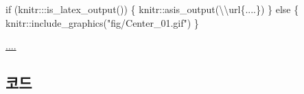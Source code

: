 \documentclass[
  b5paperpaper,
  DIV=11,
  numbers=noendperiod]{scrreprt}
\newenvironment{Shaded}{\begin{snugshade}}{\end{snugshade}}
\newcommand{\ControlFlowTok}[1]{\textcolor[rgb]{0.00,0.23,0.31}{#1}}
\newcommand{\FunctionTok}[1]{\textcolor[rgb]{0.28,0.35,0.67}{#1}}
\newcommand{\NormalTok}[1]{\textcolor[rgb]{0.00,0.23,0.31}{#1}}
\newcommand{\SpecialCharTok}[1]{\textcolor[rgb]{0.37,0.37,0.37}{#1}}
\newcommand{\StringTok}[1]{\textcolor[rgb]{0.13,0.47,0.30}{#1}}
\begin{document}
\begin{Shaded}
\begin{Highlighting}[]
\ControlFlowTok{if}\NormalTok{ (knitr}\SpecialCharTok{:::}\FunctionTok{is\_latex\_output}\NormalTok{()) \{}
\NormalTok{  knitr}\SpecialCharTok{::}\FunctionTok{asis\_output}\NormalTok{(}\StringTok{\textquotesingle{}}\SpecialCharTok{\textbackslash{}\textbackslash{}}\StringTok{url\{....\}\textquotesingle{}}\NormalTok{)}
\NormalTok{\} }\ControlFlowTok{else}\NormalTok{ \{}
\NormalTok{  knitr}\SpecialCharTok{::}\FunctionTok{include\_graphics}\NormalTok{(}\StringTok{"fig/Center\_01.gif"}\NormalTok{)}
\NormalTok{\}}
\end{Highlighting}
\end{Shaded}

\url{....}

\hypertarget{uxcf54uxb4dc-24}{%
\subsection{코드}\label{uxcf54uxb4dc-24}}
\end{document}
